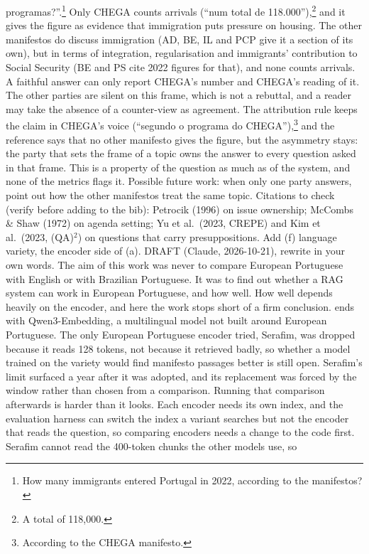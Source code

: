 {programas?''.\footnote{How many immigrants entered Portugal in 2022,
according to the manifestos?} Only CHEGA counts arrivals (``num total de
118.000''),\footnote{A total of 118,000.} and it
gives the figure as evidence that immigration puts pressure on housing. The
other manifestos do discuss immigration (AD, BE, IL and PCP give it a section
of its own), but in terms of integration, regularisation and immigrants'
contribution to Social Security (BE and PS cite 2022 figures for that), and
none counts arrivals. A faithful answer can only report CHEGA's number and
CHEGA's reading of it. The other parties are silent on this frame, which is
not a rebuttal, and a reader may take the absence of a counter-view as
agreement. The attribution rule keeps the claim in CHEGA's voice
(``segundo o programa do CHEGA''),\footnote{According to the CHEGA
manifesto.} and the reference says that no other
manifesto gives the figure, but the asymmetry stays: the party that sets the
frame of a topic owns the answer to every question asked in that frame. This
is a property of the question as much as of the system, and none of the
metrics flags it. Possible future work: when only one party answers, point
out how the other manifestos treat the same topic. Citations to check
(verify before adding to the bib): Petrocik (1996) on issue ownership;
McCombs \& Shaw (1972) on agenda setting; Yu et al.\ (2023, CREPE) and
Kim et al.\ (2023, (QA)$^2$) on questions that carry presuppositions.
Add (f) language variety, the encoder side of (a). DRAFT (Claude, 2026-10-21),
rewrite in your own words.
The aim of this work was never to compare European Portuguese with English or
with Brazilian Portuguese. It was to find out whether a RAG system can work in
European Portuguese, and how well. How well depends heavily on the encoder,
and here the work stops short of a firm conclusion. \sysname{} ends with
Qwen3-Embedding, a multilingual model not built around European Portuguese.
The only European Portuguese encoder tried, Serafim, was dropped because it
reads 128 tokens, not because it retrieved badly, so whether a model trained
on the variety would find manifesto passages better is still open. Serafim's
limit surfaced a year after it was adopted, and its replacement was forced by
the window rather than chosen from a comparison. Running that comparison
afterwards is harder than it looks. Each encoder needs its own index, and the
evaluation harness can switch the index a variant searches but not the encoder
that reads the question, so comparing encoders needs a change to the code
first. Serafim cannot read the 400-token chunks the other models use, so
}
